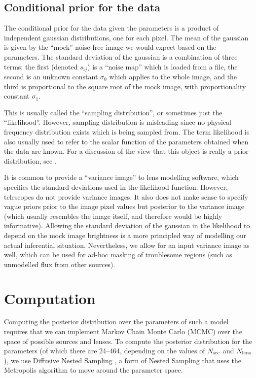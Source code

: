 \documentclass[useAMS,usenatbib]{mn2e}
\begin{document}
\subsection{Conditional prior for the data}
The conditional prior for the data given the parameters
is a product of independent gaussian distributions, one for each pixel.
The mean of the gaussian is given by the ``mock'' noise-free image we would
expect based on the parameters. The standard deviation of the gaussian is
a combination of three terms; the first (denoted $s_{ij}$) is a ``noise map''
which is loaded from a file, the second is an unknown constant $\sigma_0$
which applies to the whole image, and the third is proportional to the
square root of the mock image, with proportionality constant $\sigma_1$.

This is usually called the ``sampling distribution'', or sometimes just the
``likelihood''. However, sampling distribution is misleading since no
physical frequency distribution exists which is being sampled from. The term
likelihood is also usually used to refer to the scalar function of the parameters
obtained when the data are known. For a discussion of the view that this
object is really a prior distribution, see \citet[][pp. 33--35]{caticha}.

It is common to provide a ``variance image'' to lens modelling software,
which specifies the standard deviations used in the likelihood function.
However, telescopes do not provide variance images. It also does not make
sense to specify vague priors prior to the image pixel values but posterior to
the variance image (which usually resembles the image itself, and therefore
would be highly informative). Allowing the standard deviation of the gaussian in the
likelihood to depend on the mock image brightness is a more principled way
of modelling our actual inferential situation. Nevertheless, we allow for an
input variance image as well, which can be used for ad-hoc masking of
troublesome regions (such as unmodelled flux from other sources).

\section{Computation}
Computing the posterior distribution over the parameters of such a model
requires that we can implement Markov Chain Monte Carlo (MCMC) over the space
of possible sources and lenses.
To compute the posterior distribution for the parameters
(of which there are 24--464, depending on the values of $N_{\rm src}$ and
$N_{\rm lens}$), we use Diffusive Nested Sampling \citep{dnest}, a form
of Nested Sampling \citep{skilling} that uses the Metropolis algorithm
to move around the parameter space.
\end{document}
